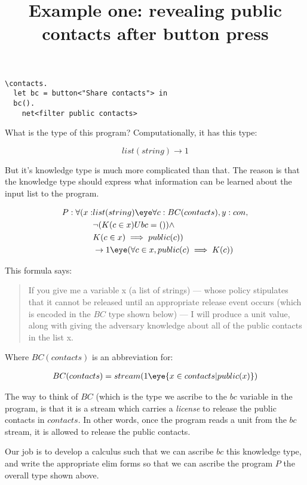 \documentclass{article}
\begin{document}
\title{Example one: revealing public contacts after button press}
\maketitle

\begin{verbatim}
\contacts.
  let bc = button<"Share contacts"> in
  bc().
    net<filter public contacts>
\end{verbatim}

What is the type of this program?  Computationally, it has this type:

\[
list(string) \to 1
\]

But it's knowledge type is much more complicated than that.  The
reason is that the knowledge type should express what information can
be learned about the input list to the program.

\begin{align}
P : \forall (x : & list(string) \text{\eye} \forall c : BC(contacts), y : con, \\
                   & \lnot (K(c \in x) U bc = ()) \land \\
                   & K(c \in x) \implies public(c)) \\ 
                   & \to 1 \text{\eye} (\forall c \in x, public(c) \implies K(c))
\end{align}

This formula says:

\begin{quote}
  If you give me a variable x (a list of strings) --- whose policy
  stipulates that it cannot be released until an appropriate release
  event occurs (which is encoded in the $BC$ type shown below) --- I
  will produce a unit value, along with giving the adversary knowledge
  about all of the public contacts in the list x.
\end{quote}

Where $BC(contacts)$ is an abbreviation for:

\begin{align}
BC(contacts) = stream(1 \text{\eye} \{x \in contacts | public(x) \})
\end{align}

The way to think of $BC$ (which is the type we ascribe to the $bc$
variable in the program, is that it is a stream which carries a
\emph{license} to release the public contacts in $contacts$.  In other
words, once the program reads a unit from the $bc$ stream, it is
allowed to release the public contacts.

Our job is to develop a calculus such that we can ascribe $bc$ this
knowledge type, and write the appropriate elim forms so that we can
ascribe the program $P$ the overall type shown above.
\end{document}
